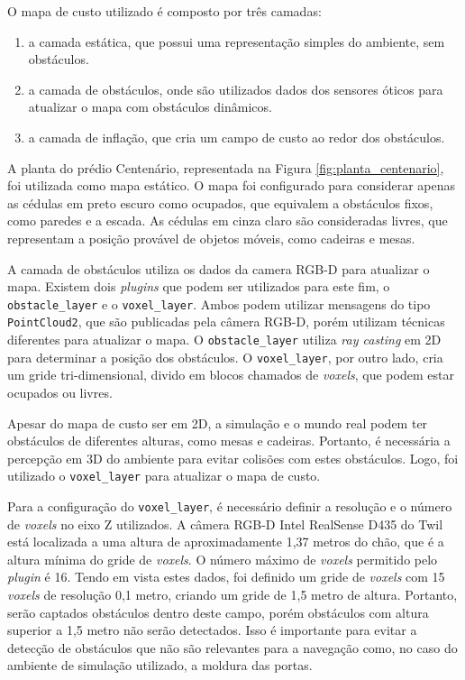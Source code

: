 \documentclass[repeatfields,xlists,xpacks,oneside,yearsonly]{ufrgscca}
\begin{document}
O mapa de custo utilizado é composto por três camadas:
\begin{enumerate}
    \item a camada estática, que possui uma representação simples do ambiente,
          sem obstáculos.
    \item a camada de obstáculos, onde são utilizados dados dos sensores óticos
          para atualizar o mapa com obstáculos dinâmicos.
    \item a camada de inflação, que cria um campo de custo ao redor dos
          obstáculos.
\end{enumerate}

A planta do prédio Centenário, representada na Figura
\ref{fig:planta_centenario}, foi utilizada como mapa estático. O mapa
foi configurado para considerar apenas as cédulas em preto escuro
como ocupados, que equivalem a obstáculos fixos, como paredes e a
escada. As cédulas em cinza claro são consideradas livres, que
representam a posição provável de objetos móveis, como cadeiras e
mesas.

A camada de obstáculos utiliza os dados da camera RGB-D para
atualizar o mapa. Existem dois \textit{plugins} que podem ser
utilizados para este fim, o \texttt{obstacle\_layer} e o
\texttt{voxel\_layer}. Ambos podem utilizar mensagens do tipo
\texttt{PointCloud2}, que são publicadas pela câmera RGB-D, porém
utilizam técnicas diferentes para atualizar o mapa.  O \texttt{obstacle\_layer} utiliza
\textit{ray casting} em 2D para determinar a posição dos obstáculos.
O \texttt{voxel\_layer}, por outro lado, cria um gride
tri-dimensional, divido em blocos chamados de \textit{voxels}, que
podem estar ocupados ou livres.

Apesar do mapa de custo ser em 2D, a simulação e o mundo real podem
ter obstáculos de diferentes alturas, como mesas e cadeiras.
Portanto, é necessária a percepção em 3D do ambiente para evitar
colisões com estes obstáculos. Logo, foi utilizado o
\texttt{voxel\_layer} para atualizar o mapa de custo.

Para a configuração do \texttt{voxel\_layer}, é necessário definir a
resolução e o número de \textit{voxels} no eixo Z utilizados. A
câmera RGB-D Intel RealSense D435 do Twil está localizada a uma
altura de aproximadamente 1,37 metros do chão, que é a altura mínima
do gride de \textit{voxels}. O número máximo de \textit{voxels}
permitido pelo \textit{plugin} é 16. Tendo em vista estes dados, foi
definido um gride de \textit{voxels} com 15 \textit{voxels} de
resolução 0,1 metro, criando um gride de 1,5 metro de altura.
Portanto, serão captados obstáculos dentro deste campo, porém
obstáculos com altura superior a 1,5 metro não serão detectados. Isso
é importante para evitar a detecção de obstáculos que não são
relevantes para a navegação como, no caso do ambiente de simulação
utilizado, a moldura das portas.
\end{document}
